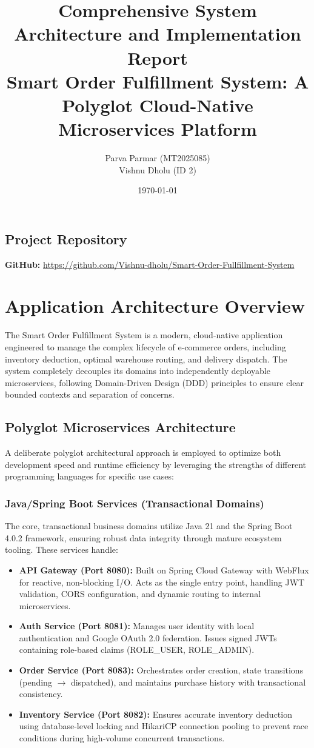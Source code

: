 \documentclass[12pt,a4paper]{report}
\title{
    \Huge \textbf{Comprehensive System Architecture and Implementation Report} \\
    \vspace{1cm}
    \Large Smart Order Fulfillment System: A Polyglot Cloud-Native Microservices Platform
}
\author{
    Parva Parmar (MT2025085) \\
    Vishnu Dholu (ID 2)
}
\date{\today}
\begin{document}
\maketitle

\section*{Project Repository}
\textbf{GitHub:} \url{https://github.com/Vishnu-dholu/Smart-Order-Fullfillment-System}

\tableofcontents
\newpage

\chapter{Application Architecture Overview}
The Smart Order Fulfillment System is a modern, cloud-native application engineered to manage the complex lifecycle of e-commerce orders, including inventory deduction, optimal warehouse routing, and delivery dispatch. The system completely decouples its domains into independently deployable microservices, following Domain-Driven Design (DDD) principles to ensure clear bounded contexts and separation of concerns.

\section{Polyglot Microservices Architecture}

A deliberate polyglot architectural approach is employed to optimize both development speed and runtime efficiency by leveraging the strengths of different programming languages for specific use cases:

\subsection{Java/Spring Boot Services (Transactional Domains)}
The core, transactional business domains utilize Java 21 and the Spring Boot 4.0.2 framework, ensuring robust data integrity through mature ecosystem tooling. These services handle:
\begin{itemize}
    \item \textbf{API Gateway (Port 8080):} Built on Spring Cloud Gateway with WebFlux for reactive, non-blocking I/O. Acts as the single entry point, handling JWT validation, CORS configuration, and dynamic routing to internal microservices.
    \item \textbf{Auth Service (Port 8081):} Manages user identity with local authentication and Google OAuth 2.0 federation. Issues signed JWTs containing role-based claims (ROLE\_USER, ROLE\_ADMIN).
    \item \textbf{Order Service (Port 8083):} Orchestrates order creation, state transitions (pending $\rightarrow$ dispatched), and maintains purchase history with transactional consistency.
    \item \textbf{Inventory Service (Port 8082):} Ensures accurate inventory deduction using database-level locking and HikariCP connection pooling to prevent race conditions during high-volume concurrent transactions.
\end{itemize}
\end{document}
